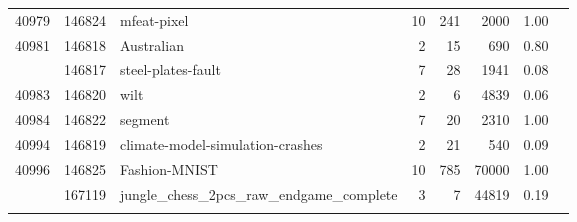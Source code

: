 \documentclass[twoside,11pt]{article}
\begin{document}
\begin{table}[h]
\begin{adjustbox}{center, width=7.75cm, totalheight=12cm}
\begin{tabular}{rrlrrrrr}
40979 & 146824 & mfeat-pixel & 10 & 241 & 2000 & 1.00\\
40981 & 146818 & Australian & 2 & 15 & 690 & 0.80\\
\addlinespace
40982 & 146817 & steel-plates-fault & 7 & 28 & 1941 & 0.08\\
40983 & 146820 & wilt & 2 & 6 & 4839 & 0.06\\
40984 & 146822 & segment & 7 & 20 & 2310 & 1.00\\
40994 & 146819 & climate-model-simulation-crashes & 2 & 21 & 540 & 0.09\\
40996 & 146825 & Fashion-MNIST & 10 & 785 & 70000 & 1.00\\
\addlinespace
41027 & 167119 & jungle\_chess\_2pcs\_raw\_endgame\_complete & 3 & 7 & 44819 & 0.19\\


 &  &  &  &  &  & \\


\bottomrule
\end{tabular}
\end{adjustbox}
\end{table}
\end{document}
